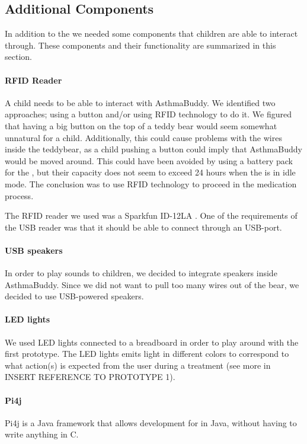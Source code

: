   
\subsection{Additional Components}
In addition to the \rpi{} we needed some components that children are able to interact through. These components and their functionality are summarized in this section. 


\paragraph{RFID Reader}
A child needs to be able to interact with AsthmaBuddy. We identified two approaches; using a button and/or using RFID technology to do it. We figured that having a big button on the top of a teddy bear would seem somewhat unnatural for a child. Additionally, this could cause problems with the wires inside the teddybear, as a child pushing a button could imply that AsthmaBuddy would be moved around. This could have been avoided by using a battery pack for the \rpi{}, but their capacity does not seem to exceed 24 hours when the \rpi{} is in idle mode. The conclusion was to use RFID technology to proceed in the medication process.


The RFID reader we used was a Sparkfun ID-12LA . One of the requirements of the USB reader was that it should be able to connect through an USB-port. 
         
\paragraph{USB speakers}
In order to play sounds to children, we decided to integrate speakers inside AsthmaBuddy. Since we did not want to pull too many wires out of the bear, we decided to use USB-powered speakers.    

\paragraph{LED lights}
We used LED lights connected to a breadboard in order to play around with the first prototype. The LED lights emits light in different colors to correspond to what action(s) is expected from the user during a treatment (see more in INSERT REFERENCE TO PROTOTYPE 1).

\paragraph{Pi4j}
Pi4j is a Java framework that allows development for \rpi{} in Java, without having to write anything in C. 


